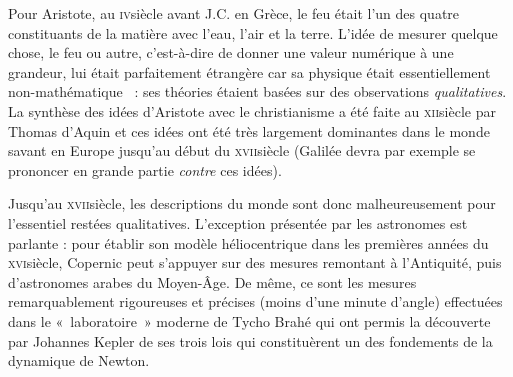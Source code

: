 \atstartofhistorysection
{}
\label{ch_histoire_degre_chaleur_depondt}


	Pour Aristote, au \textsc{iv}\ieme siècle avant J.C. en Grèce, le feu était l'un des quatre constituants de la matière avec l'eau, l'air et la terre. L'idée de mesurer quelque chose, le feu ou autre, c'est-à-dire de donner une valeur numérique à une grandeur, lui était parfaitement étrangère car sa physique était essentiellement non-mathématique~\cite{koyre1966} : ses théories étaient basées sur des observations \emph{qualitatives}. La synthèse des idées d'Aristote avec le christianisme a été faite au \textsc{xii}\ieme siècle par Thomas d'Aquin et ces idées ont été très largement dominantes dans le monde savant en Europe jusqu'au début du \textsc{xvii}\ieme siècle (Galilée devra par exemple se prononcer en grande partie \emph{contre} ces idées).
	
	Jusqu’au \textsc{xvii}\ieme siècle, les descriptions du monde sont donc malheureusement pour l'essentiel restées qualitatives. L’exception présentée par les astronomes est parlante : pour établir son modèle héliocentrique dans les premières années du \textsc{xvi}\ieme siècle, Copernic peut s'appuyer sur des mesures remontant à l'Antiquité, puis d’astronomes arabes du Moyen-Âge. De même, ce sont les mesures remarquablement rigoureuses et précises (moins d'une minute d'angle) effectuées dans le «~laboratoire~» moderne de Tycho Brahé qui ont permis la découverte par Johannes Kepler de ses trois lois qui constituèrent un des fondements de la dynamique de Newton.
		

